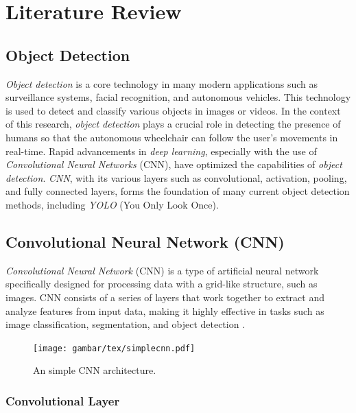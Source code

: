 \section{Literature Review}
\label{sec:literaturereview}

\subsection{Object Detection}
\label{subsec:detection}

\emph{Object detection} is a core technology in many modern applications such as surveillance systems, facial recognition, and autonomous vehicles. This technology is used to detect and classify various objects in images or videos. In the context of this research, \emph{object detection} plays a crucial role in detecting the presence of humans so that the autonomous wheelchair can follow the user's movements in real-time. Rapid advancements in \emph{deep learning}, especially with the use of \emph{Convolutional Neural Networks} (CNN), have optimized the capabilities of \emph{object detection}. \emph{CNN}, with its various layers such as convolutional, activation, pooling, and fully connected layers, forms the foundation of many current object detection methods, including \emph{YOLO} (You Only Look Once).

\subsection{Convolutional Neural Network (CNN)}
\label{subsec:cnn}

\emph{Convolutional Neural Network} (CNN) is a type of artificial neural network specifically designed for processing data with a grid-like structure, such as images. CNN consists of a series of layers that work together to extract and analyze features from input data, making it highly effective in tasks such as image classification, segmentation, and object detection \cite{oshea2015cnn}.

\begin{figure}[H]
  \centering
  \texttt{[image: gambar/tex/simplecnn.pdf]}
  \caption{An simple CNN architecture.}
  \label{fig:simplecnn}
  \end{figure}

\vspace{5pt}
\subsubsection{Convolutional Layer}
\label{subsubsec:Convolutional Layer}

